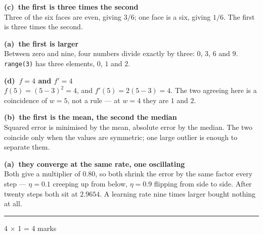 \documentclass[10pt,a4paper]{article}
\newcommand{\parthead}[2]{\vspace{2pt}\noindent\rule{\linewidth}{0.4pt}\par\vspace{2pt}%
  \noindent{\bfseries Part #1}\hfill{\small #2}\par\vspace{1pt}}
\newcommand{\sol}[1]{\textbf{#1}}
\begin{document}
\begin{sA}

  \item \sol{(c)\ the first is three times the second}\\ Three of the six faces are even, giving $3/6$; one face is a six, giving $1/6$. The first is three times the second.

  \item \sol{(a)\ the first is larger}\\ Between zero and nine, four numbers divide exactly by three: $0$, $3$, $6$ and $9$. \texttt{range(3)} has three elements, $0$, $1$ and $2$.

  \item \sol{(d)\ $f = 4$ and $f' = 4$}\\ $f(5) = (5-3)^2 = 4$, and $f'(5) = 2(5-3) = 4$. The two agreeing here is a coincidence of $w = 5$, not a rule --- at $w = 4$ they are $1$ and $2$.

  \item \sol{(b)\ the first is the mean, the second the median}\\ Squared error is minimised by the mean, absolute error by the median. The two coincide only when the values are symmetric; one large outlier is enough to separate them.

  \item \sol{(a)\ they converge at the same rate, one oscillating}\\ Both give a multiplier of $0.80$, so both shrink the error by the same factor every step --- $\eta = 0.1$ creeping up from below, $\eta = 0.9$ flipping from side to side. After twenty steps both sit at $2.9654$. A learning rate nine times larger bought nothing at all.

\end{sA}

\vspace{3pt}

\parthead{B --- Fill in the blanks}{4 $\times$ 1 = 4 marks}
\end{document}
